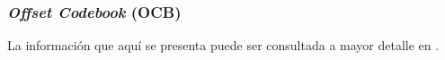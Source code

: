 %
%

\subsubsection{\textit{Offset Codebook} (OCB)}

La información que aquí se presenta puede ser consultada a mayor detalle en
\cite{ofb_modo}.
